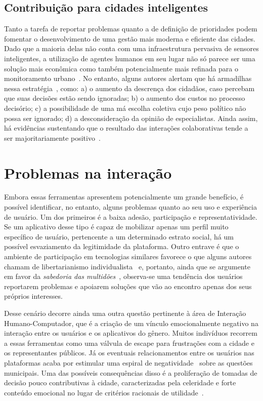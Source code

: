 \documentclass{sigchi}
\begin{document}
\subsection{Contribuição para cidades inteligentes}
Tanto a tarefa de reportar problemas quanto a de definição de prioridades podem fomentar o desenvolvimento de uma gestão mais moderna e eficiente das cidades. Dado que a maioria delas não conta com uma infraestrutura pervasiva de sensores inteligentes, a utilização de agentes humanos em seu lugar não só parece ser uma solução mais econômica como também potencialmente mais refinada para o monitoramento urbano~\cite{zambonelli:2011}. No entanto, alguns autores alertam que há armadilhas nessa estratégia~\cite{irvin:2004, brabham:2009}, como: a) o aumento da descrença dos cidadãos, caso percebam que suas decisões estão sendo ignoradas; b) o aumento dos custos no processo decisório; c) a possibilidade de uma má escolha coletiva cujo peso político não possa ser ignorado; d) a desconsideração da opinião de especialistas. Ainda assim, há evidências sustentando que o resultado das interações colaborativas tende a ser majoritariamente positivo~\cite{schuurman:2012}.

\section{Problemas na interação}
Embora essas ferramentas apresentem potencialmente um grande benefício, é possível identificar, no entanto, alguns problemas quanto ao seu uso e experiência de usuário. Um dos primeiros é a baixa adesão, participação e representatividade. Se um aplicativo desse tipo é capaz de mobilizar apenas um perfil muito específico de usuário, pertencente a um determinado estrato social, há um possível esvaziamento da legitimidade da plataforma. Outro entrave é que o ambiente de participação em tecnologias similares favorece o que alguns autores chamam de libertarianismo individualista~\cite{brabham:2008} e, portanto, ainda que se argumente em favor da \textit{sabedoria das multidões}~\cite{surowiecki:2005}, observa-se uma tendência dos usuários reportarem problemas e apoiarem soluções que vão ao encontro apenas dos seus próprios interesses.

Desse cenário decorre ainda uma outra questão pertinente à área de Interação Humano-Computador, que é a criação de um vínculo emocionalmente negativo na interação entre os usuários e os aplicativos do gênero. Muitos indivíduos recorrem a essas ferramentas como uma válvula de escape para frustrações com a cidade e os representantes públicos. Já os eventuais relacionamentos entre os usuários nas plataformas acaba por estimular uma espiral de negatividade~\cite{slater:2007} sobre as questões municipais. Uma das possíveis consequências disso é a proliferação de tomadas de decisão pouco contributivas à cidade, caracterizadas pela celeridade e forte conteúdo emocional no lugar de critérios racionais de utilidade~\cite{tversky:1986}.
\end{document}
